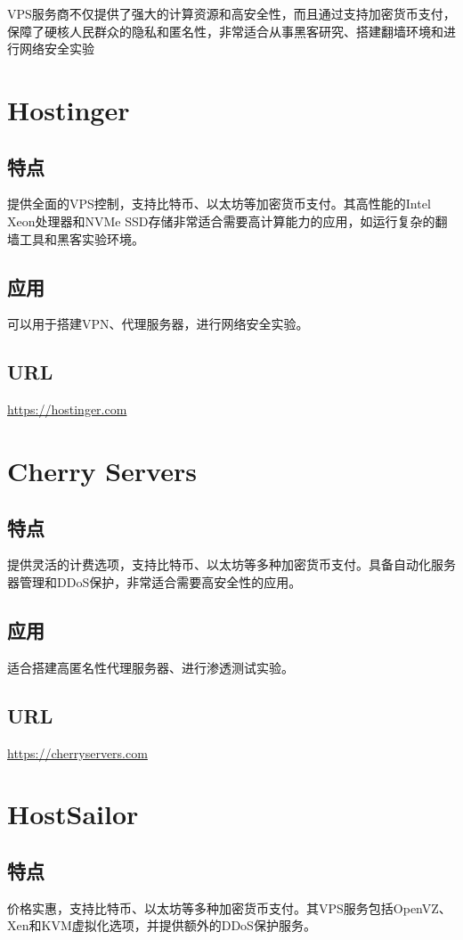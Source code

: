 \documentclass[11pt]{article}
\date{\today}
\title{}
\begin{document}
\tableofcontents

VPS服务商不仅提供了强大的计算资源和高安全性，而且通过支持加密货币支付，保障了硬核人民群众的隐私和匿名性，非常适合从事黑客研究、搭建翻墙环境和进行网络安全实验
\section{Hostinger}
\label{sec:orge6ca384}
\subsection{特点}
\label{sec:org33d6977}
提供全面的VPS控制，支持比特币、以太坊等加密货币支付。其高性能的Intel Xeon处理器和NVMe SSD存储非常适合需要高计算能力的应用，如运行复杂的翻墙工具和黑客实验环境。
\subsection{应用}
\label{sec:orgb3ab2ef}
可以用于搭建VPN、代理服务器，进行网络安全实验。
\subsection{URL}
\label{sec:org5708efb}
\url{https://hostinger.com}

\section{Cherry Servers}
\label{sec:orgeefa31f}
\subsection{特点}
\label{sec:org6111999}
提供灵活的计费选项，支持比特币、以太坊等多种加密货币支付。具备自动化服务器管理和DDoS保护，非常适合需要高安全性的应用。
\subsection{应用}
\label{sec:org0155199}
适合搭建高匿名性代理服务器、进行渗透测试实验。
\subsection{URL}
\label{sec:org7ee6f0f}
\url{https://cherryservers.com}

\section{HostSailor}
\label{sec:orge61899f}
\subsection{特点}
\label{sec:org2f38202}
价格实惠，支持比特币、以太坊等多种加密货币支付。其VPS服务包括OpenVZ、Xen和KVM虚拟化选项，并提供额外的DDoS保护服务。
\end{document}
